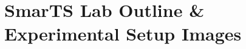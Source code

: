 \documentclass[journal]{IEEEtran}
\begin{document}
%
%
%


\section{SmarTS Lab Outline \& Experimental Setup Images}
\end{document}
